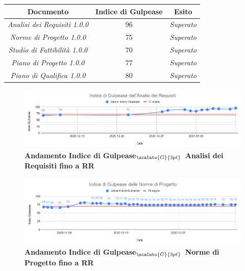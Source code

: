 \quad
\def\tabularxcolumn#1{m{#1}}
{
	\begin{center}
		\renewcommand{\arraystretch}{1.4}
		\begin{tabularx}{11.50cm}{|c|c|c|}
			\hline
			\rowcolor{airforceblue}
			\textbf{Documento} & \textbf{Indice di Gulpease} & \textbf{Esito}\\
			\hline
			\textit{Analisi dei Requisiti 1.0.0} & 96  & \textit{Superato}\\
			\hline
			\textit{Norme di Progetto 1.0.0} & 75 & \textit{Superato}\\
			\hline
			\textit{Studio di Fattibilità 1.0.0} & 70 & \textit{Superato}\\
			\hline
			\textit{Piano di Progetto 1.0.0} & 77 & \textit{Superato}\\
			\hline
			\textit{Piano di Qualifica 1.0.0} & 80 & \textit{Superato}\\
			\hline
		\end{tabularx}
	\end{center}


\begin{figure}[!h]
	\begin{center}
		\includegraphics[width=1\linewidth]{../immagini/IndexGulpeaseAdR.png}
		\caption{\textbf{Andamento Indice di Gulpease$_{\scaleto{G}{3pt}}$ Analisi dei Requisiti fino a RR}}
	\end{center}
\end{figure}

\begin{figure}[!h]
	\begin{center}
		\includegraphics[width=1\linewidth]{../immagini/IndexGulpeaseNdP.png}
		\caption{\textbf{Andamento Indice di Gulpease$_{\scaleto{G}{3pt}}$ Norme di Progetto fino a RR}}
	\end{center}
\end{figure}

}
